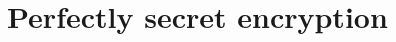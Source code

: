 \documentclass[../main]{subfiles}
\begin{document}
\chapter{Perfectly secret encryption}
\end{document}
